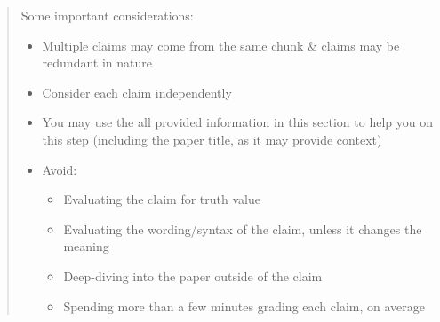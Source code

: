 \begin{quote}
Some important considerations:
\begin{itemize}
    \item Multiple claims may come from the same chunk \& claims may be redundant in nature
    \item Consider each claim independently
    \item You may use the all provided information in this section to help you on this step (including the paper title, as it may provide context)
    \item Avoid:
    \begin{itemize}
        \item Evaluating the claim for truth value
        \item Evaluating the wording/syntax of the claim, unless it changes the meaning
        \item Deep-diving into the paper outside of the claim
        \item Spending more than a few minutes grading each claim, on average
    \end{itemize}
\end{itemize}


\end{quote}
